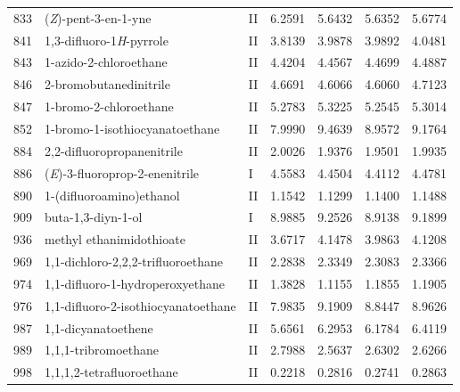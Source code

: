 \begin{longtable}{rlld{2.5}d{2.5}d{2.5}d{2.5}}
    833  & (\textit{Z})-pent-3-en-1-yne                           & II & 6.2591  & 5.6432  & 5.6352  & 5.6774  \\
    841  & 1,3-difluoro-1\textit{H}-pyrrole                       & II & 3.8139  & 3.9878  & 3.9892  & 4.0481  \\
    843  & 1-azido-2-chloroethane                                 & II & 4.4204  & 4.4567  & 4.4699  & 4.4887  \\
    846  & 2-bromobutanedinitrile                                 & II & 4.6691  & 4.6066  & 4.6060  & 4.7123  \\
    847  & 1-bromo-2-chloroethane                                 & II & 5.2783  & 5.3225  & 5.2545  & 5.3014  \\
    852  & 1-bromo-1-isothiocyanatoethane                         & II & 7.9990  & 9.4639  & 8.9572  & 9.1764  \\
    884  & 2,2-difluoropropanenitrile                             & II & 2.0026  & 1.9376  & 1.9501  & 1.9935  \\
    886  & (\textit{E})-3-fluoroprop-2-enenitrile                 & I  & 4.5583  & 4.4504  & 4.4112  & 4.4781  \\
    890  & 1-(difluoroamino)ethanol                               & II & 1.1542  & 1.1299  & 1.1400  & 1.1488  \\
    909  & buta-1,3-diyn-1-ol                                     & I  & 8.9885  & 9.2526  & 8.9138  & 9.1899  \\
    936  & methyl ethanimidothioate                               & II & 3.6717  & 4.1478  & 3.9863  & 4.1208  \\
    969  & 1,1-dichloro-2,2,2-trifluoroethane                     & II & 2.2838  & 2.3349  & 2.3083  & 2.3366  \\
    974  & 1,1-difluoro-1-hydroperoxyethane                       & II & 1.3828  & 1.1155  & 1.1855  & 1.1905  \\
    976  & 1,1-difluoro-2-isothiocyanatoethane                    & II & 7.9835  & 9.1909  & 8.8447  & 8.9626  \\
    987  & 1,1-dicyanatoethene                                    & II & 5.6561  & 6.2953  & 6.1784  & 6.4119  \\
    989  & 1,1,1-tribromoethane                                   & II & 2.7988  & 2.5637  & 2.6302  & 2.6266  \\
    998  & 1,1,1,2-tetrafluoroethane                              & II & 0.2218  & 0.2816  & 0.2741  & 0.2863  \\

\end{longtable}
